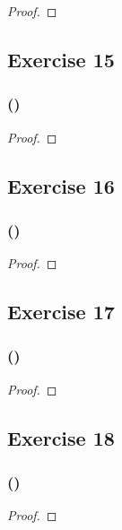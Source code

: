 \documentclass[14pt]{extarticle}
\begin{document}
\begin{proof}

\end{proof}

\subsection{Exercise 15}

\subsubsection{()}

\begin{proof}

\end{proof}

\subsection{Exercise 16}

\subsubsection{()}

\begin{proof}

\end{proof}

\subsection{Exercise 17}

\subsubsection{()}

\begin{proof}

\end{proof}

\subsection{Exercise 18}

\subsubsection{()}

\begin{proof}

\end{proof}
\end{document}
